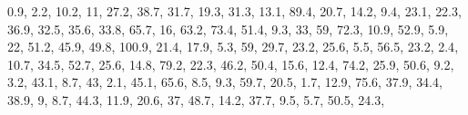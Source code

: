 \documentclass[]{book}
\newenvironment{Shaded}{\begin{snugshade}}{\end{snugshade}}
\newcommand{\DecValTok}[1]{\textcolor[rgb]{0.00,0.00,0.81}{#1}}
\newcommand{\FloatTok}[1]{\textcolor[rgb]{0.00,0.00,0.81}{#1}}
\newcommand{\NormalTok}[1]{#1}
\begin{document}
\begin{Shaded}
\begin{Highlighting}[]
    \FloatTok{0.9}\NormalTok{, }\FloatTok{2.2}\NormalTok{, }\FloatTok{10.2}\NormalTok{, }\DecValTok{11}\NormalTok{, }\FloatTok{27.2}\NormalTok{, }\FloatTok{38.7}\NormalTok{, }\FloatTok{31.7}\NormalTok{, }\FloatTok{19.3}\NormalTok{, }\FloatTok{31.3}\NormalTok{, }\FloatTok{13.1}\NormalTok{, }\FloatTok{89.4}\NormalTok{, }\FloatTok{20.7}\NormalTok{, }\FloatTok{14.2}\NormalTok{, }
    \FloatTok{9.4}\NormalTok{, }\FloatTok{23.1}\NormalTok{, }\FloatTok{22.3}\NormalTok{, }\FloatTok{36.9}\NormalTok{, }\FloatTok{32.5}\NormalTok{, }\FloatTok{35.6}\NormalTok{, }\FloatTok{33.8}\NormalTok{, }\FloatTok{65.7}\NormalTok{, }\DecValTok{16}\NormalTok{, }\FloatTok{63.2}\NormalTok{, }\FloatTok{73.4}\NormalTok{, }\FloatTok{51.4}\NormalTok{, }\FloatTok{9.3}\NormalTok{, }
    \DecValTok{33}\NormalTok{, }\DecValTok{59}\NormalTok{, }\FloatTok{72.3}\NormalTok{, }\FloatTok{10.9}\NormalTok{, }\FloatTok{52.9}\NormalTok{, }\FloatTok{5.9}\NormalTok{, }\DecValTok{22}\NormalTok{, }\FloatTok{51.2}\NormalTok{, }\FloatTok{45.9}\NormalTok{, }\FloatTok{49.8}\NormalTok{, }\FloatTok{100.9}\NormalTok{, }\FloatTok{21.4}\NormalTok{, }\FloatTok{17.9}\NormalTok{, }
    \FloatTok{5.3}\NormalTok{, }\DecValTok{59}\NormalTok{, }\FloatTok{29.7}\NormalTok{, }\FloatTok{23.2}\NormalTok{, }\FloatTok{25.6}\NormalTok{, }\FloatTok{5.5}\NormalTok{, }\FloatTok{56.5}\NormalTok{, }\FloatTok{23.2}\NormalTok{, }\FloatTok{2.4}\NormalTok{, }\FloatTok{10.7}\NormalTok{, }\FloatTok{34.5}\NormalTok{, }\FloatTok{52.7}\NormalTok{, }\FloatTok{25.6}\NormalTok{, }
    \FloatTok{14.8}\NormalTok{, }\FloatTok{79.2}\NormalTok{, }\FloatTok{22.3}\NormalTok{, }\FloatTok{46.2}\NormalTok{, }\FloatTok{50.4}\NormalTok{, }\FloatTok{15.6}\NormalTok{, }\FloatTok{12.4}\NormalTok{, }\FloatTok{74.2}\NormalTok{, }\FloatTok{25.9}\NormalTok{, }\FloatTok{50.6}\NormalTok{, }\FloatTok{9.2}\NormalTok{, }\FloatTok{3.2}\NormalTok{, }\FloatTok{43.1}\NormalTok{, }
    \FloatTok{8.7}\NormalTok{, }\DecValTok{43}\NormalTok{, }\FloatTok{2.1}\NormalTok{, }\FloatTok{45.1}\NormalTok{, }\FloatTok{65.6}\NormalTok{, }\FloatTok{8.5}\NormalTok{, }\FloatTok{9.3}\NormalTok{, }\FloatTok{59.7}\NormalTok{, }\FloatTok{20.5}\NormalTok{, }\FloatTok{1.7}\NormalTok{, }\FloatTok{12.9}\NormalTok{, }\FloatTok{75.6}\NormalTok{, }\FloatTok{37.9}\NormalTok{, }\FloatTok{34.4}\NormalTok{, }
    \FloatTok{38.9}\NormalTok{, }\DecValTok{9}\NormalTok{, }\FloatTok{8.7}\NormalTok{, }\FloatTok{44.3}\NormalTok{, }\FloatTok{11.9}\NormalTok{, }\FloatTok{20.6}\NormalTok{, }\DecValTok{37}\NormalTok{, }\FloatTok{48.7}\NormalTok{, }\FloatTok{14.2}\NormalTok{, }\FloatTok{37.7}\NormalTok{, }\FloatTok{9.5}\NormalTok{, }\FloatTok{5.7}\NormalTok{, }\FloatTok{50.5}\NormalTok{, }\FloatTok{24.3}\NormalTok{, }

\end{Highlighting}
\end{Shaded}
\end{document}
